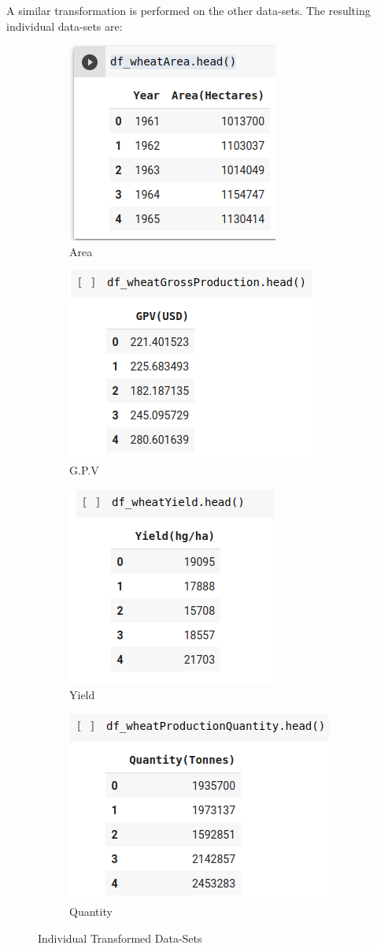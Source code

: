 A similar transformation is performed on the other data-sets. The resulting individual data-sets are: 
\begin{figure}
	\centering
	\begin{subfigure}{.25\textwidth}
		\centering
		\includegraphics[width=.4\linewidth]{fig/areaHectares.png}
		\caption{Area}
		\label{fig:sub1}
	\end{subfigure}%
	\begin{subfigure}{.24\textwidth}
		\centering
		\includegraphics[width=.4\linewidth]{fig/gpv.png}
		\caption{G.P.V}
		\label{fig:sub2}
	\end{subfigure}
	\begin{subfigure}{.25\textwidth}
		\centering
		\includegraphics[width=.4\linewidth]{fig/yield.png}
		\caption{Yield}
		\label{fig:sub3}
	\end{subfigure}
	\begin{subfigure}{.24\textwidth}
		\centering
		\includegraphics[width=.4\linewidth]{fig/quantityTonnes.png}
		\caption{Quantity}
		\label{fig:sub4}
	\end{subfigure}

	\caption{Individual Transformed Data-Sets}
	\label{fig:heads}
\end{figure}



